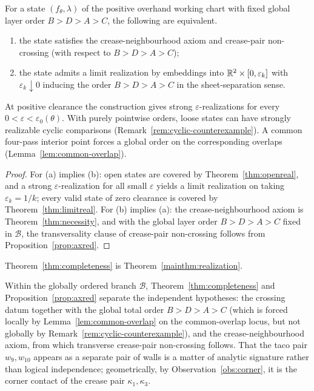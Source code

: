 \begin{theorem}\label{thm:completeness}
For a state $(f_\theta,\lambda)$ of the positive overhand working chart with fixed global layer order $B>D>A>C$, the following are equivalent.
\begin{enumerate}
\item[(a)] the state satisfies the crease-neighbourhood axiom and crease-pair non-crossing (with respect to $B>D>A>C$);
\item[(b)] the state admits a limit realization by embeddings into $\mathbb{R}^2\times[0,\varepsilon_k]$ with $\varepsilon_k\downarrow0$ inducing the order $B>D>A>C$ in the sheet-separation sense.
\end{enumerate}
At positive clearance the construction gives strong $\varepsilon$-realizations for every $0<\varepsilon<\varepsilon_0(\theta)$. With purely pointwise orders, loose states can have strongly realizable cyclic comparisons \textup{(Remark~\ref{rem:cyclic-counterexample})}. A common four-pass interior point forces a global order on the corresponding overlaps \textup{(Lemma~\ref{lem:common-overlap})}.
\end{theorem}

\begin{proof}
For (a) implies (b): open states are covered by Theorem~\ref{thm:openreal}, and a strong $\varepsilon$-realization for all small $\varepsilon$ yields a limit realization on taking $\varepsilon_k=1/k$; every valid state of zero clearance is covered by Theorem~\ref{thm:limitreal}. For (b) implies (a): the crease-neighbourhood axiom is Theorem~\ref{thm:necessity}, and with the global layer order $B>D>A>C$ fixed in $\mathcal B$, the transversality clause of crease-pair non-crossing follows from Proposition~\ref{prop:axred}.
\end{proof}

Theorem~\ref{thm:completeness} is Theorem~\ref{mainthm:realization}.

\begin{remark}\label{rem:axiomreduction}
Within the globally ordered branch $\mathcal B$, Theorem~\ref{thm:completeness} and Proposition~\ref{prop:axred} separate the independent hypotheses: the crossing datum together with the global total order $B>D>A>C$ (which is forced locally by Lemma~\ref{lem:common-overlap} on the common-overlap locus, but not globally by Remark~\ref{rem:cyclic-counterexample}), and the crease-neighbourhood axiom, from which transverse crease-pair non-crossing follows. That the taco pair $w_9,w_{10}$ appears as a separate pair of walls is a matter of analytic signature rather than logical independence; geometrically, by Observation~\ref{obs:corner}, it is the corner contact of the crease pair $\kappa_1,\kappa_3$.
\end{remark}

